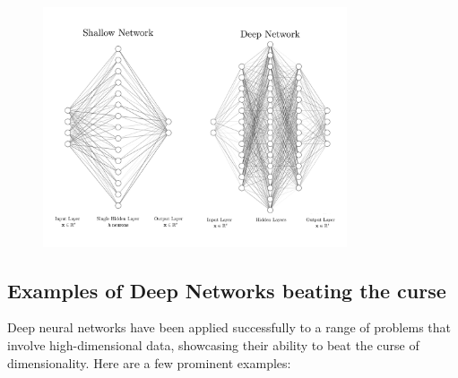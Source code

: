\documentclass[11pt,a4paper]{article}
\theoremstyle{plain}
\theoremstyle{definition}
\theoremstyle{remark}
\begin{document}
\begin{figure}[h!]
    \centering
    \includegraphics[width=0.8\textwidth]{diags/shallow_deep.png}
\end{figure}

\subsection{Examples of Deep Networks beating the curse}

Deep neural networks have been applied successfully to a range of problems that involve high-dimensional data, showcasing their ability to beat the curse of dimensionality. Here are a few prominent examples:
\end{document}
